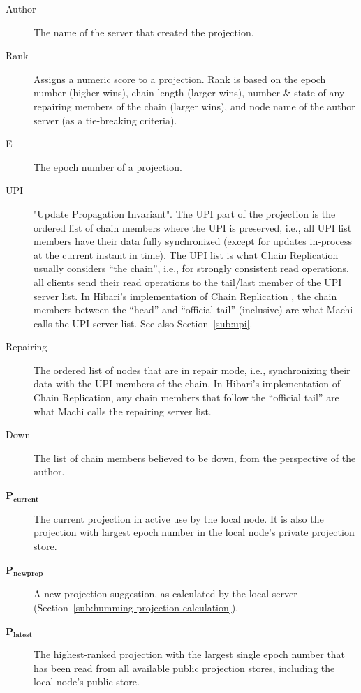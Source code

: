 \documentclass[preprint,10pt]{sigplanconf}
\begin{document}
\begin{description}
\item[Author] The name of the server that created the projection.

\item[Rank] Assigns a numeric score to a projection.  Rank is based on the
  epoch number (higher wins), chain length (larger wins), number \&
  state of any repairing members of the chain (larger wins), and node
  name of the author server (as a tie-breaking criteria).

\item[E] The epoch number of a projection.

\item[UPI] "Update Propagation Invariant".  The UPI part of the projection
  is the ordered list of chain members where the UPI is preserved,
  i.e., all UPI list members have their data fully synchronized
  (except for updates in-process at the current instant in time).
  The UPI list is what Chain Replication usually considers ``the
  chain'', i.e., for strongly consistent read operations, all clients
  send their read operations to the tail/last member of the UPI server
  list.
  In Hibari's implementation of Chain Replication
  \cite{cr-theory-and-practice}, the chain members between the
  ``head'' and ``official tail'' (inclusive) are what Machi calls the
  UPI server list.  See also Section~\ref{sub:upi}.

\item[Repairing] The ordered list of nodes that are in repair mode,
  i.e., synchronizing their data with the UPI members of the chain.
  In Hibari's implementation of Chain Replication, any chain members
  that follow the ``official tail'' are what Machi calls the repairing
  server list.

\item[Down] The list of chain members believed to be down, from the
  perspective of the author.

\item[$\mathbf{P_{current}}$] The current projection in active use by the local
  node.  It is also the projection with largest
  epoch number in the local node's private projection store.

\item[$\mathbf{P_{newprop}}$] A new projection suggestion, as
  calculated by the local server
  (Section~\ref{sub:humming-projection-calculation}).

\item[$\mathbf{P_{latest}}$] The highest-ranked projection with the largest
  single epoch number that has been read from all available public
  projection stores, including the local node's public store.


\end{description}
\end{document}
